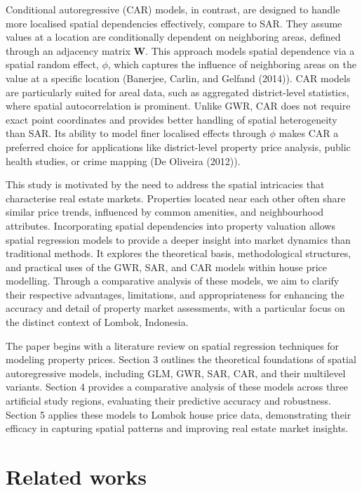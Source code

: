 \documentclass[
  default,
]{sn-jnl}
\begin{document}
Conditional autoregressive (CAR) models, in contrast, are designed to
handle more localised spatial dependencies effectively, compare to SAR.
They assume values at a location are conditionally dependent on
neighboring areas, defined through an adjacency matrix \(\mathbf{W}\).
This approach models spatial dependence via a spatial random effect,
\(\phi\), which captures the influence of neighboring areas on the value
at a specific location (Banerjee, Carlin, and Gelfand (2014)). CAR
models are particularly suited for areal data, such as aggregated
district-level statistics, where spatial autocorrelation is prominent.
Unlike GWR, CAR does not require exact point coordinates and provides
better handling of spatial heterogeneity than SAR. Its ability to model
finer localised effects through \(\phi\) makes CAR a preferred choice
for applications like district-level property price analysis, public
health studies, or crime mapping (De Oliveira (2012)).

This study is motivated by the need to address the spatial intricacies
that characterise real estate markets. Properties located near each
other often share similar price trends, influenced by common amenities,
and neighbourhood attributes. Incorporating spatial dependencies into
property valuation allows spatial regression models to provide a deeper
insight into market dynamics than traditional methods. It explores the
theoretical basis, methodological structures, and practical uses of the
GWR, SAR, and CAR models within house price modelling. Through a
comparative analysis of these models, we aim to clarify their respective
advantages, limitations, and appropriateness for enhancing the accuracy
and detail of property market assessments, with a particular focus on
the distinct context of Lombok, Indonesia.

The paper begins with a literature review on spatial regression
techniques for modeling property prices. Section 3 outlines the
theoretical foundations of spatial autoregressive models, including GLM,
GWR, SAR, CAR, and their multilevel variants. Section 4 provides a
comparative analysis of these models across three artificial study
regions, evaluating their predictive accuracy and robustness. Section 5
applies these models to Lombok house price data, demonstrating their
efficacy in capturing spatial patterns and improving real estate market
insights.

\section{Related works}\label{related-works}
\end{document}
